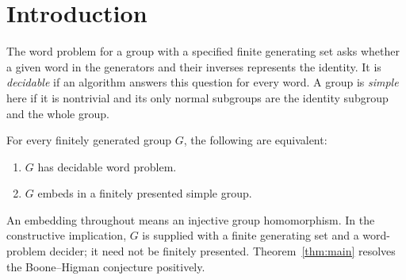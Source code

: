 \section{Introduction}\label{sec:introduction}

The word problem for a group with a specified finite generating set asks
whether a given word in the generators and their inverses represents the
identity. It is \emph{decidable} if an algorithm answers this question for
every word. A group is \emph{simple} here if it is nontrivial and its only
normal subgroups are the identity subgroup and the whole group.

\begin{theorem}\label{thm:main}
For every finitely generated group \(G\), the following are equivalent:
\begin{enumerate}[label=\textup{(\roman*)}]
\item \(G\) has decidable word problem.
\item \(G\) embeds in a finitely presented simple group.
\end{enumerate}
\end{theorem}

An embedding throughout means an injective group homomorphism. In the
constructive implication, \(G\) is supplied with a finite generating set
and a word-problem decider; it need not be finitely presented.
Theorem~\ref{thm:main} resolves the Boone--Higman conjecture positively.
